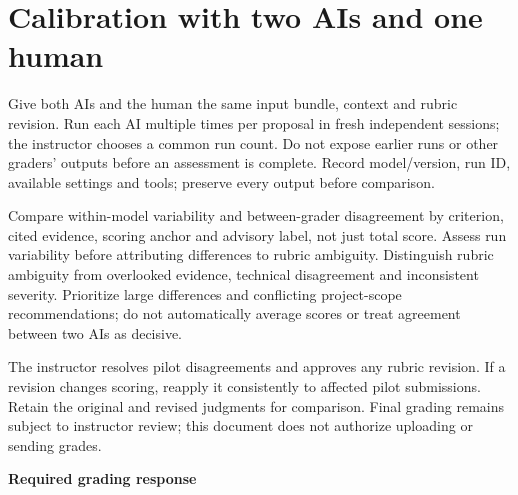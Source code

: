 \documentclass{article}
\begin{document}
\section*{Calibration with two AIs and one human}
Give both AIs and the human the same input bundle, context and rubric revision. Run each AI multiple times per proposal in fresh independent sessions; the instructor chooses a common run count. Do not expose earlier runs or other graders' outputs before an assessment is complete. Record model/version, run ID, available settings and tools; preserve every output before comparison.

Compare within-model variability and between-grader disagreement by criterion, cited evidence, scoring anchor and advisory label, not just total score. Assess run variability before attributing differences to rubric ambiguity. Distinguish rubric ambiguity from overlooked evidence, technical disagreement and inconsistent severity. Prioritize large differences and conflicting project-scope recommendations; do not automatically average scores or treat agreement between two AIs as decisive.

The instructor resolves pilot disagreements and approves any rubric revision. If a revision changes scoring, reapply it consistently to affected pilot submissions. Retain the original and revised judgments for comparison. Final grading remains subject to instructor review; this document does not authorize uploading or sending grades.

\newpage
\begin{center}{\large\bfseries Required grading response}\end{center}
\end{document}
